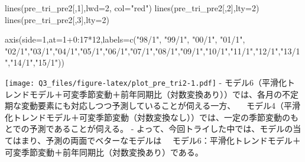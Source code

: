 \documentclass[]{article}
\newenvironment{Shaded}{\begin{snugshade}}{\end{snugshade}}
\newcommand{\AttributeTok}[1]{\textcolor[rgb]{0.77,0.63,0.00}{#1}}
\newcommand{\DecValTok}[1]{\textcolor[rgb]{0.00,0.00,0.81}{#1}}
\newcommand{\FunctionTok}[1]{\textcolor[rgb]{0.00,0.00,0.00}{#1}}
\newcommand{\NormalTok}[1]{#1}
\newcommand{\SpecialCharTok}[1]{\textcolor[rgb]{0.00,0.00,0.00}{#1}}
\newcommand{\StringTok}[1]{\textcolor[rgb]{0.31,0.60,0.02}{#1}}
\begin{document}
\begin{Shaded}
\begin{Highlighting}[]
\FunctionTok{lines}\NormalTok{(pre\_tri\_pre2[,}\DecValTok{1}\NormalTok{],}\AttributeTok{lwd=}\DecValTok{2}\NormalTok{, }\AttributeTok{col=}\StringTok{"red"}\NormalTok{)}
\FunctionTok{lines}\NormalTok{(pre\_tri\_pre2[,}\DecValTok{2}\NormalTok{],}\AttributeTok{lty=}\DecValTok{2}\NormalTok{)}
\FunctionTok{lines}\NormalTok{(pre\_tri\_pre2[,}\DecValTok{3}\NormalTok{],}\AttributeTok{lty=}\DecValTok{2}\NormalTok{)}

\FunctionTok{axis}\NormalTok{(}\AttributeTok{side=}\DecValTok{1}\NormalTok{,}\AttributeTok{at=}\DecValTok{1}\SpecialCharTok{+}\DecValTok{0}\SpecialCharTok{:}\DecValTok{17}\SpecialCharTok{*}\DecValTok{12}\NormalTok{,}\AttributeTok{labels=}\FunctionTok{c}\NormalTok{(}\StringTok{"98/1"}\NormalTok{, }\StringTok{"99/1"}\NormalTok{, }\StringTok{"00/1"}\NormalTok{, }\StringTok{"01/1"}\NormalTok{, }\StringTok{"02/1"}\NormalTok{,}\StringTok{"03/1"}\NormalTok{,}\StringTok{"04/1"}\NormalTok{,}\StringTok{"05/1"}\NormalTok{,}\StringTok{"06/1"}\NormalTok{,}\StringTok{"07/1"}\NormalTok{,}\StringTok{"08/1"}\NormalTok{,}\StringTok{"09/1"}\NormalTok{,}\StringTok{"10/1"}\NormalTok{,}\StringTok{"11/1"}\NormalTok{,}\StringTok{"12/1"}\NormalTok{,}\StringTok{"13/1"}\NormalTok{,}\StringTok{"14/1"}\NormalTok{,}\StringTok{"15/1"}\NormalTok{))}
\end{Highlighting}
\end{Shaded}

\texttt{[image: Q3\_files/figure-latex/plot\_pre\_tri2-1.pdf]} -
モデル6（平滑化トレンドモデル＋可変季節変動＋前年同期比（対数変換あり））では、各月の不定期な変動要素にも対応しつつ予測していることが伺える一方、
　モデル4（平滑化トレンドモデル＋可変季節変動（対数変換なし））では、一定の季節変動のもとでの予測であることが伺える。
-
よって、今回トライした中では、モデルの当てはまり、予測の両面でベターなモデルは
　モデル6：平滑化トレンドモデル＋可変季節変動＋前年同期比（対数変換あり）である。
　
\end{document}
